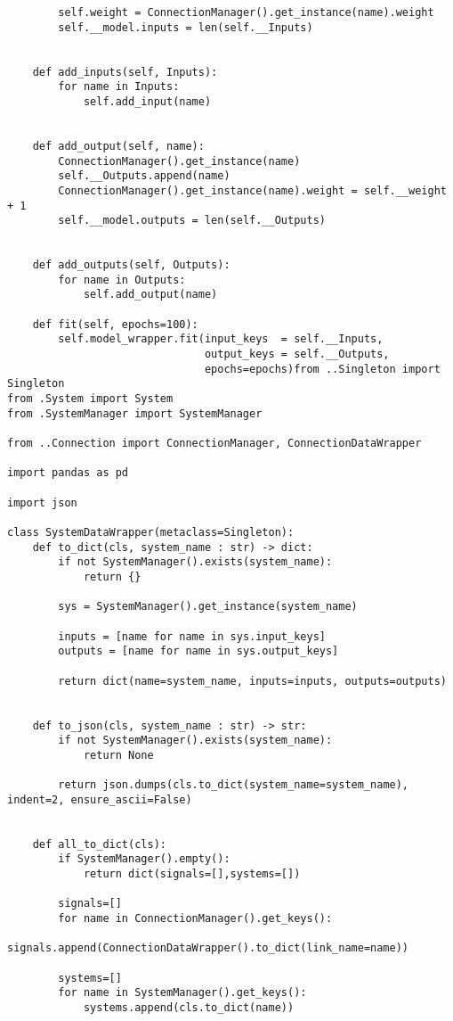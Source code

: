 {\begin{lstlisting}
        self.weight = ConnectionManager().get_instance(name).weight
        self.__model.inputs = len(self.__Inputs)
    
    
    def add_inputs(self, Inputs):
        for name in Inputs:
            self.add_input(name)
    
        
    def add_output(self, name):
        ConnectionManager().get_instance(name)
        self.__Outputs.append(name)
        ConnectionManager().get_instance(name).weight = self.__weight + 1
        self.__model.outputs = len(self.__Outputs)
    
        
    def add_outputs(self, Outputs):
        for name in Outputs:
            self.add_output(name)
    
    def fit(self, epochs=100):
        self.model_wrapper.fit(input_keys  = self.__Inputs, 
                               output_keys = self.__Outputs,
                               epochs=epochs)from ..Singleton import Singleton
from .System import System
from .SystemManager import SystemManager

from ..Connection import ConnectionManager, ConnectionDataWrapper

import pandas as pd

import json

class SystemDataWrapper(metaclass=Singleton):
    def to_dict(cls, system_name : str) -> dict:
        if not SystemManager().exists(system_name):
            return {}
        
        sys = SystemManager().get_instance(system_name)
        
        inputs = [name for name in sys.input_keys]        
        outputs = [name for name in sys.output_keys]
        
        return dict(name=system_name, inputs=inputs, outputs=outputs)

    
    def to_json(cls, system_name : str) -> str:
        if not SystemManager().exists(system_name):
            return None
        
        return json.dumps(cls.to_dict(system_name=system_name), indent=2, ensure_ascii=False)

    
    def all_to_dict(cls):
        if SystemManager().empty():
            return dict(signals=[],systems=[])
        
        signals=[]
        for name in ConnectionManager().get_keys():
            signals.append(ConnectionDataWrapper().to_dict(link_name=name))
        
        systems=[]
        for name in SystemManager().get_keys():
            systems.append(cls.to_dict(name))
        

\end{lstlisting}}
